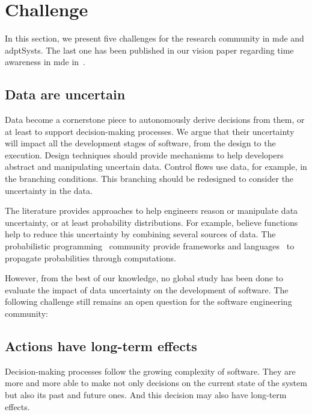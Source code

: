 \section{Challenge}

In this section, we present five challenges for the research community in \gls{mde} and \glspl{adptSyst}.
The last one has been published in our vision paper regarding time awareness in \gls{mde} in~\cite{DBLP:conf/models/Benelallam0MFBB17}.

\subsection{Data are uncertain}
\label{intro:challenges:u-data}
Data become a cornerstone piece to autonomously derive decisions from them, or at least to support decision-making processes.
We argue that their uncertainty will impact all the development stages of software, from the design to the execution.
Design techniques should provide mechanisms to help developers abstract and manipulating uncertain data.
Control flows use data, for example, in the branching conditions.
This branching should be redesigned to consider the uncertainty in the data.

The literature provides approaches to help engineers reason or manipulate data uncertainty, or at least probability distributions.
For example, believe functions~\cite{shafer1992dempster} help to reduce this uncertainty by combining several sources of data.
The probabilistic programming~\cite{DBLP:conf/icse/GordonHNR14} community provide frameworks and languages~\cite{url:InferNET18, baudin2017openturns} to propagate probabilities through computations.

However, from the best of our knowledge, no global study has been done to evaluate the impact of data uncertainty on the development of software.
The following challenge still remains an open question for the software engineering community:
\vspace{-2em}

\subsection{Actions have long-term effects}
\label{intro:challenges:long-term-act}
Decision-making processes follow the growing complexity of software.
They are more and more able to make not only decisions on the current state of the system but also its past and future ones.
And this decision may also have long-term effects.

